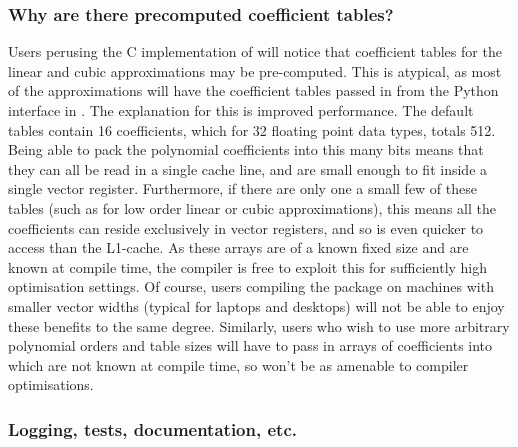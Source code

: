\subsubsection{Why are there precomputed coefficient tables?}

Users perusing the C implementation of \arv will notice that coefficient tables for the linear and cubic approximations may be pre-computed. This is atypical, as most of the approximations will have the coefficient tables passed in from the Python interface in \pyarv. The explanation for this is improved performance. The default tables contain 16 coefficients, which for \qty{32}{\bit} floating point data types, totals \qty{512}{\bit}. Being able to pack the polynomial coefficients into this many bits means that they can all be read in a single cache line, and are small enough to fit inside a single vector register. Furthermore, if there are only one a small few of these tables (such as for low order linear or cubic approximations), this means all the coefficients can reside exclusively in vector registers, and so is even quicker to access than the L1-cache. As these arrays are of a known fixed size and are known at compile time, the compiler is free to exploit this for sufficiently high optimisation settings. Of course, users compiling the package on machines with smaller vector widths (typical for laptops and desktops) will not be able to enjoy these benefits to the same degree. Similarly, users who wish to use more arbitrary polynomial orders and table sizes will have to pass in arrays of coefficients into \arv which are not known at compile time, so won't be as amenable to compiler optimisations. 

\subsubsection{Logging, tests, documentation, etc.}


